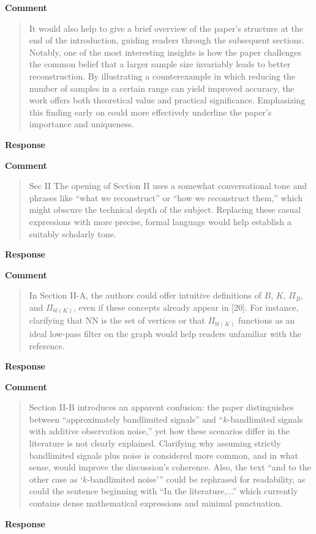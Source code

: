 \documentclass[11pt,onecolumn,journal]{IEEEtran}
\begin{document}
\textbf{Comment}
\begin{quote}
It would also help to give a brief overview of the paper’s structure at the end of the introduction, guiding readers through the subsequent sections. Notably, one of the most interesting insights is how the paper challenges the common belief that a larger sample size invariably leads to better reconstruction. By illustrating a counterexample in which reducing the number of samples in a certain range can yield improved accuracy, the work offers both theoretical value and practical significance. Emphasizing this finding early on could more effectively underline the paper’s importance and uniqueness.
\end{quote}
\textbf{Response}


\textbf{Comment}
\begin{quote}
Sec II
The opening of Section II uses a somewhat conversational tone and phrases like “what we reconstruct” or “how we reconstruct them,” which might obscure the technical depth of the subject. Replacing these casual expressions with more precise, formal language would help establish a suitably scholarly tone.
\end{quote}
\textbf{Response}


\textbf{Comment}
\begin{quote}
In Section II-A, the authors could offer intuitive definitions of $B$, $K$, $\Pi_{B}$, and $\Pi_{bl(K)}$, even if these concepts already appear in [20]. For instance, clarifying that NN is the set of vertices or that $\Pi_{bl(K)}$ functions as an ideal low-pass filter on the graph would help readers unfamiliar with the reference.

\end{quote}
\textbf{Response}


\textbf{Comment}
\begin{quote}

Section II-B introduces an apparent confusion: the paper distinguishes between “approximately bandlimited signals” and “$k$-bandlimited signals with additive observation noise,” yet how these scenarios differ in the literature is not clearly explained. Clarifying why assuming strictly bandlimited signals plus noise is considered more common, and in what sense, would improve the discussion’s coherence. Also, the text “and to the other case as ‘$k$-bandlimited noise’” could be rephrased for readability, as could the sentence beginning with “In the literature,...” which currently contains dense mathematical expressions and minimal punctuation.

\end{quote}
\textbf{Response}
\end{document}
